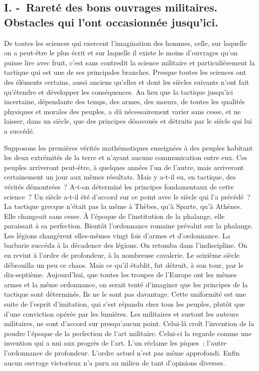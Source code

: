 \documentclass[french,twoside]{book} %
\begin{document}
\subsection[{I. - Rareté des bons ouvrages militaires. Obstacles qui l’ont occasionnée jusqu’ici.}]{I. - Rareté des bons ouvrages militaires. Obstacles qui l’ont occasionnée jusqu’ici.}
\noindent De toutes les sciences qui exercent l’imagination des hommes, celle, sur laquelle on a peut-être le plus écrit et sur laquelle il existe le moins d’ouvrages qu’on puisse lire avec fruit, c’est sans contredit la science militaire et particulièrement la tactique qui est une de ses principales branches. Presque toutes les sciences ont des éléments certains, aussi anciens qu’elles et dont les siècles suivants n’ont fait qu’étendre et développer les conséquences. Au lieu que la tactique jusqu’ici incertaine, dépendante des temps, des armes, des mœurs, de toutes les qualités physiques et morales des peuples, a dû nécessairement varier sans cesse, et ne laisser, dans un siècle, que des principes désavoués et détruits par le siècle qui lui a succédé.\par
Supposons les premières vérités mathématiques enseignées à des peuples habitant les deux extrémités de la terre et n’ayant aucune communication entre eux. Ces peuples arriveront peut-être, à quelques années l’un de l’autre, mais arriveront certainement un jour aux mêmes résultats. Mais y a-t-il eu, en tactique, des vérités démontrées ? A-t-on déterminé les principes fondamentaux de cette science ? Un siècle a-t-il été d’accord sur ce point avec le siècle qui l’a précédé ? La tactique grecque n’était pas la même à Thèbes, qu’à Sparte, qu’à Athènes. Elle changeait sans cesse. À l’époque de l’institution de la phalange, elle paraissait à sa perfection. Bientôt l’ordonnance romaine prévalut sur la phalange. Les légions changèrent elles-mêmes vingt fois d’armes et d’ordonnance. La barbarie succéda à la décadence des légions. On retomba dans l’indiscipline. On en revint à l’ordre de profondeur, à la nombreuse cavalerie. Le seizième siècle débrouilla un peu ce chaos. Mais ce qu’il établit, fut détruit, à son tour, par le dix-septième. Aujourd’hui, que toutes les troupes de l’Europe ont les mêmes armes et la même ordonnance, on serait tenté d’imaginer que les principes de la tactique sont déterminés. Ils ne le sont pas davantage. Cette uniformité est une suite de l’esprit d’imitation, qui s’est répandu chez tous les peuples, plutôt que d’une conviction opérée par les lumières. Les militaires et surtout les auteurs militaires, ne sont d’accord sur presqu’aucun point. Celui-là croît l’invention de la poudre l’époque de la perfection de l’art militaire. Celui-ci la regarde comme une invention qui a nui aux progrès de l’art. L’un réclame les piques ; l’autre l’ordonnance de profondeur. L’ordre actuel n’est pas même approfondi. Enfin aucun ouvrage victorieux n’a paru au milieu de tant d’opinions diverses.\par
\end{document}
